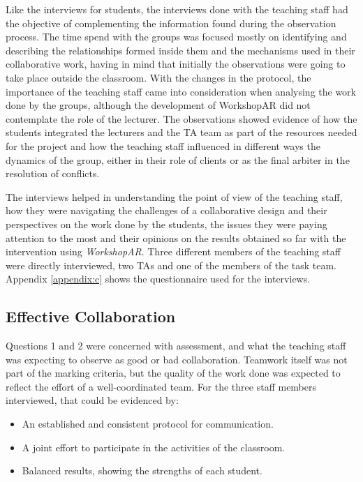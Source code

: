 Like the interviews for students, the interviews done with the teaching staff had the objective of complementing the information found during the observation process. The
time spend with the groups was focused mostly on identifying and describing the relationships formed inside them and the mechanisms used in their collaborative work,
having in mind that initially the observations were going to take place outside the classroom. With the changes in the protocol, the importance of the teaching staff came
into consideration when analysing the work done by the groups, although the development of WorkshopAR did not contemplate the role of the lecturer. The observations
showed evidence of how the students integrated the lecturers and the \ac{TA} team as part of the resources needed for the project and how the teaching staff influenced in
different ways the dynamics of the group, either in their role of clients or as the final arbiter in the resolution of conflicts.

The interviews helped in understanding the point of view of the teaching staff, how they were navigating the challenges of a collaborative design and their perspectives
on the work done by the students, the issues they were paying attention to the most and their opinions on the results obtained so far with the intervention using
\emph{WorkshopAR}. Three different members of the teaching staff were directly interviewed, two \ac{TA}s and one of the members of the task team. Appendix \ref{appendix:c}
shows the questionnaire used for the interviews.

\subsection{Effective Collaboration \label{sec:6-10-1}}

Questions 1 and 2 were concerned with assessment, and what the teaching staff was expecting to observe as good or bad collaboration. Teamwork itself was not part of the
marking criteria, but the quality of the work done was expected to reflect the effort of a well-coordinated team. For the three staff members interviewed, that could be
evidenced by:

\begin{itemize}
    \item An established and consistent protocol for communication.
    \item A joint effort to participate in the activities of the classroom.
    \item Balanced results, showing the strengths of each student.
\end{itemize}

